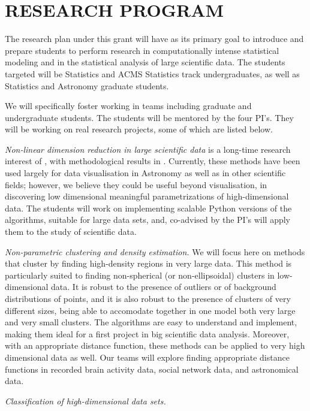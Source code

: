 \section{RESEARCH PROGRAM}
\label{sec:research}

The research plan under this grant will have as its primary goal to
introduce and prepare students to perform research in computationally
intense statistical modeling and in the statistical analysis of large
scientific data. The students targeted will be Statistics and ACMS
Statistics track undergraduates, as well as Statistics and Astronomy
graduate students. 

We will specifically foster working in teams including graduate and
undergraduate students. The students will be mentored by the four
PI's. They will be working on real research projects, some of which
are listed below. 
\bits
\item {\em Non-linear dimension reduction in large scientific data} is a long-time research interest of \meila, with methodological results in \cite{x}. Currently, these methods have been used largely for data visualisation in Astronomy as well as in other scientific fields; however, we believe they could be useful beyond visualisation, in discovering low dimensional meaningful parametrizations of high-dimensional data. The students will work on implementing scalable Python versions of the algorithms, suitable for large data sets, and, co-advised by the PI's will apply them to the study of scientific data.
\item {\em Non-parametric clustering and density estimation.} We will
  focus here on methods that cluster by finding high-density regions
  in very large data. This method is particularly suited to finding
  non-spherical (or non-ellipsoidal) clusters in low-dimensional
  data. It is robust to the presence of outliers or of background
  distributions of points, and it is also robust to the presence of
  clusters of very different sizes, being able to accomodate together
  in one model both very large and very small clusters. The algorithms
  are easy to understand and implement, making them ideal for a first
  project in big scientific data analysis. Moreover, with an
  appropriate distance function, these methods can be applied to very
  high dimensional data as well. Our teams will explore finding
  appropriate distance functions in recorded brain activity data,
  social network data, and astronomical data.  
\item {\em Classification of high-dimensional data sets.} 
